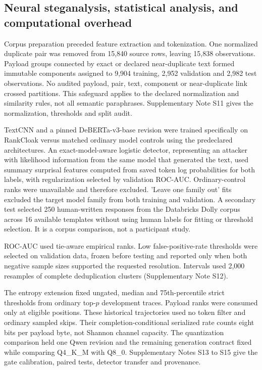 \documentclass[fleqn,10pt]{wlscirep}
\begin{document}
\subsection*{Neural steganalysis, statistical analysis, and computational overhead}\label{sec:detector-method}\label{sec:statistics-method}

Corpus preparation preceded feature extraction and tokenization. One normalized duplicate pair was removed from 15,840 source rows, leaving 15,838 observations. Payload groups connected by exact or declared near-duplicate text formed immutable components assigned to 9,904 training, 2,952 validation and 2,982 test observations. No audited payload, pair, text, component or near-duplicate link crossed partitions. This safeguard applies to the declared normalization and similarity rules, not all semantic paraphrases. Supplementary Note S11 gives the normalization, thresholds and split audit.

TextCNN and a pinned DeBERTa-v3-base revision were trained specifically on RankCloak versus matched ordinary model controls using the predeclared architectures. An exact-model-aware logistic detector, representing an attacker with likelihood information from the same model that generated the text, used summary surprisal features computed from saved token log probabilities for both labels, with regularization selected by validation ROC-AUC. Ordinary-control ranks were unavailable and therefore excluded. 'Leave one family out' fits excluded the target model family from both training and validation. A secondary test selected 250 human-written responses from the Databricks Dolly corpus across 16 available templates without using human labels for fitting or threshold selection. It is a corpus comparison, not a participant study.

ROC-AUC used tie-aware empirical ranks. Low false-positive-rate thresholds were selected on validation data, frozen before testing and reported only when both negative sample sizes supported the requested resolution. Intervals used 2,000 resamples of complete deduplication clusters (Supplementary Note S12).

The entropy extension fixed ungated, median and 75th-percentile strict thresholds from ordinary top-\(p\) development traces. Payload ranks were consumed only at eligible positions. These historical trajectories used no token filter and ordinary sampled skips. Their completion-conditional serialized rate counts eight bits per payload byte, not Shannon channel capacity. The quantization comparison held one Qwen revision and the remaining generation contract fixed while comparing Q4\_K\_M with Q8\_0. Supplementary Notes S13 to S15 give the gate calibration, paired tests, detector transfer and provenance.
\end{document}
